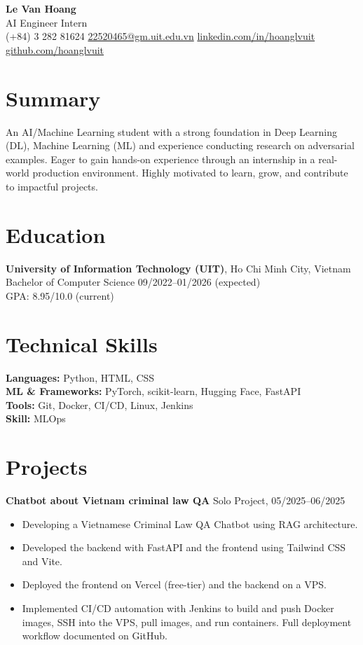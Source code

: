 \documentclass[11pt,a4paper]{article}
\begin{document}
\begin{center}
  {\LARGE\bfseries Le Van Hoang}\\[5pt]
  {\large AI Engineer Intern}\\[5pt]
  (+84) 3 282 81624 \quad
  \href{mailto:22520465@gm.uit.edu.vn}{22520465@gm.uit.edu.vn} \quad
  \href{https://www.linkedin.com/in/hoanglvuit}{linkedin.com/in/hoanglvuit} \quad
  \href{https://github.com/hoanglvuit}{github.com/hoanglvuit}
\end{center}

\section*{Summary}
An AI/Machine Learning student with a strong foundation in Deep Learning (DL), Machine Learning (ML) and experience conducting research on adversarial examples. Eager to gain hands-on experience through an internship in a real-world production environment. Highly motivated to learn, grow, and contribute to impactful projects.

\section*{Education}
\textbf{University of Information Technology (UIT)}, Ho Chi Minh City, Vietnam\\
Bachelor of Computer Science \hfill 09/2022--01/2026 (expected)\\
GPA: 8.95/10.0 (current)

\section*{Technical Skills}
\textbf{Languages:} Python, HTML, CSS\\
\textbf{ML \& Frameworks:} PyTorch, scikit-learn, Hugging Face, FastAPI\\
\textbf{Tools:} Git, Docker, CI/CD, Linux, Jenkins\\
\textbf{Skill:} MLOps

\section*{Projects}
\textbf{Chatbot about Vietnam criminal law QA} \hfill Solo Project, 05/2025--06/2025\\
\begin{itemize}[left=0pt]
  \item Developing a Vietnamese Criminal Law QA Chatbot using RAG architecture.
  \item Developed the backend with FastAPI and the frontend using Tailwind CSS and Vite.
  \item Deployed the frontend on Vercel (free-tier) and the backend on a VPS.
  \item Implemented CI/CD automation with Jenkins to build and push Docker images, SSH into the VPS, pull images, and run containers. Full deployment workflow documented on GitHub.
\end{itemize}
\end{document}
